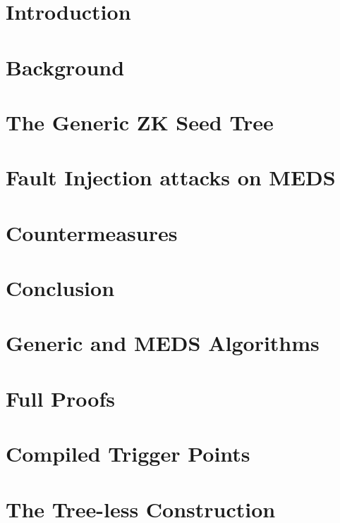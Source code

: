 \documentclass[runningheads]{llncs}
\begin{document}
\section{Introduction}
\label{sec:intro}


\section{Background}
\label{sec:background}


\section{The Generic ZK Seed Tree}
\label{sec:abstract}


\section{Fault Injection attacks on MEDS}
\label{sec:app}


\section{Countermeasures}
\label{sec:counter}


\section{Conclusion}
\label{sec:conclusion}





\clearpage
\appendix
\section{Generic and MEDS Algorithms}
\label{app:algs}


\section{Full Proofs}
\label{app:proofs}


\section{Compiled Trigger Points}
\label{app:asm}


\section{The Tree-less Construction}
\label{app:treeless}

\end{document}
